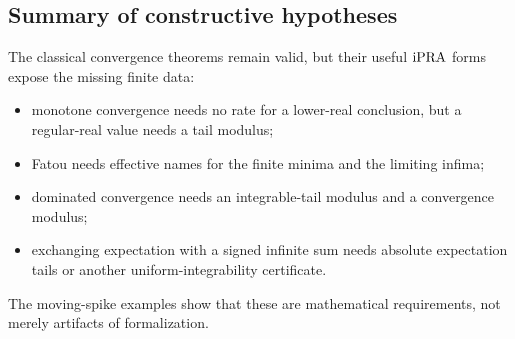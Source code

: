\subsection{Summary of constructive hypotheses}

The classical convergence theorems remain valid, but their useful
\(\mathrm{iPRA}\) forms expose the missing finite data:
\begin{itemize}
\item monotone convergence needs no rate for a lower-real conclusion, but a
  regular-real value needs a tail modulus;
\item Fatou needs effective names for the finite minima and the limiting
  infima;
\item dominated convergence needs an integrable-tail modulus and a convergence
  modulus;
\item exchanging expectation with a signed infinite sum needs absolute
  expectation tails or another uniform-integrability certificate.
\end{itemize}
The moving-spike examples show that these are mathematical requirements, not
merely artifacts of formalization.

